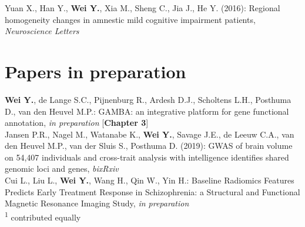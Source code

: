 \noindent
Yuan X., Han Y., \textbf{Wei Y.}, Xia M., Sheng C., Jia J., He Y. (2016): Regional homogeneity changes in amnestic mild cognitive impairment patients, \textit{Neuroscience Letters}\\

\section*{Papers in preparation}
\textbf{Wei Y.}, de Lange S.C., Pijnenburg R., Ardesh D.J., Scholtens L.H., Posthuma D., van den Heuvel M.P.: GAMBA: an integrative platform for gene functional annotation, \textit{in preparation} [\textbf{Chapter 3}]\\

\noindent
Jansen P.R., Nagel M., Watanabe K., \textbf{Wei Y.}, Savage J.E., de Leeuw C.A., van den Heuvel M.P., van der Sluis S., Posthuma D. (2019): GWAS of brain volume on 54,407 individuals and cross-trait analysis with intelligence identifies shared genomic loci and genes, \textit{bixRxiv}\\

\noindent
Cui L., Liu L., \textbf{Wei Y.}, Wang H., Qin W., Yin H.: Baseline Radiomics Features Predicts Early Treatment Response in Schizophrenia: a Structural and Functional Magnetic Resonance Imaging Study, \textit{in preparation}\\

\noindent
\textsuperscript{1} contributed equally 

